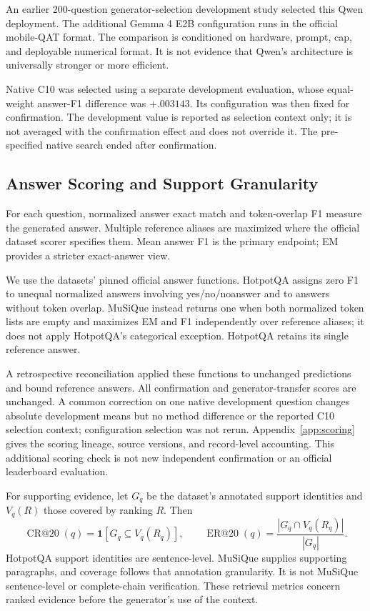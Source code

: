 \documentclass[11pt,a4paper]{article}
\begin{document}
An earlier 200-question generator-selection development study selected this
Qwen deployment. The additional Gemma 4 E2B configuration runs in the official
mobile-QAT format. The comparison is conditioned on hardware, prompt, cap,
and deployable numerical format. It is not evidence that Qwen's architecture
is universally stronger or more efficient.

Native C10 was selected using a separate development evaluation, whose
equal-weight answer-F1 difference was $+.003143$. Its configuration was then
fixed for confirmation. The development value is reported as selection
context only; it is not averaged with the confirmation effect and does not
override it. The pre-specified native search ended after confirmation.

\subsection{Answer Scoring and Support Granularity}
For each question, normalized answer exact match and token-overlap F1 measure
the generated answer. Multiple reference aliases are maximized where the
official dataset scorer specifies them. Mean answer F1 is the primary
endpoint; EM provides a stricter exact-answer view.

We use the datasets' pinned official answer functions. HotpotQA assigns zero
F1 to unequal normalized answers involving yes/no/noanswer and to answers
without token overlap. MuSiQue instead returns one when both normalized token
lists are empty and maximizes EM and F1 independently over reference aliases;
it does not apply HotpotQA's categorical exception. HotpotQA retains its single
reference answer.

A retrospective reconciliation applied these functions to unchanged
predictions and bound reference answers. All confirmation and
generator-transfer scores are unchanged. A common correction on one native
development question changes absolute development means but no method
difference or the reported C10 selection context; configuration selection was
not rerun. Appendix~\ref{app:scoring} gives the scoring lineage, source
versions, and record-level accounting. This additional scoring check is not
new independent confirmation or an official leaderboard evaluation.

For supporting evidence, let $G_q$ be the dataset's annotated support
identities and $V_q(R)$ those covered by ranking $R$. Then
\begin{equation}
\operatorname{CR@20}(q)=\mathbf{1}[G_q\subseteq V_q(R_q)],\qquad
\operatorname{ER@20}(q)=\frac{|G_q\cap V_q(R_q)|}{|G_q|}.
\end{equation}
HotpotQA support identities are sentence-level. MuSiQue supplies supporting
paragraphs, and coverage follows that annotation granularity. It is not
MuSiQue sentence-level or complete-chain verification. These retrieval
metrics concern ranked evidence before the generator's use of the context.
\end{document}
